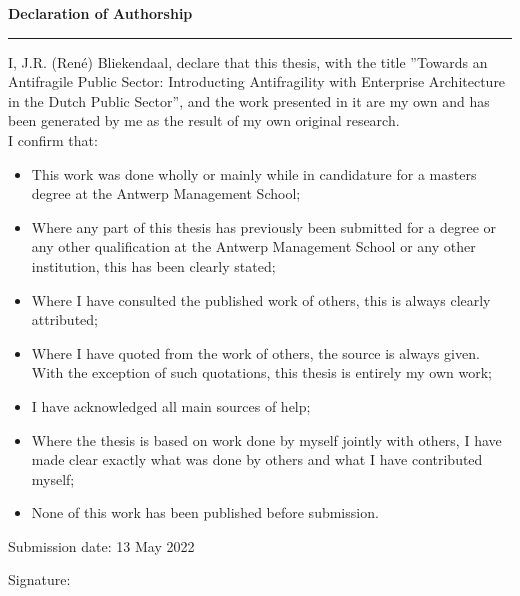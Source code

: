 \thispagestyle{plain}
\vspace*{\fill}
\LARGE
\noindent \textbf{Declaration of Authorship}
\hrule
\normalsize
\bigskip
\noindent
I, J.R. (René) Bliekendaal, declare that this thesis, with the title ''Towards an Antifragile Public Sector: Introducting Antifragility with Enterprise Architecture in the Dutch Public Sector'', and the work presented in it are my own and has been generated by me as the result of my own original research.\\

\noindent I confirm that:
\begin{itemize}
	\item{This work was done wholly or mainly while in candidature for a masters degree at the Antwerp Management School;}
	\item{Where any part of this thesis has previously been submitted for a degree or any other qualification at the Antwerp Management School or any other institution, this has been clearly stated;}
	\item{Where I have consulted the published work of others, this is always clearly attributed;}
	\item{Where I have quoted from the work of others, the source is always given. With the exception of such quotations, this thesis is entirely my own work;}
	\item{I have acknowledged all main sources of help;}
	\item{Where the thesis is based on work done by myself jointly with others, I have made clear exactly what was done by others and what I have contributed myself;}
	\item{None of this work has been published before submission.}
\end{itemize}
\bigskip

\noindent
Submission date: 13 May 2022
\bigskip

\noindent Signature: \makebox[2in]{\hrulefill}\\
\vspace*{\fill}
